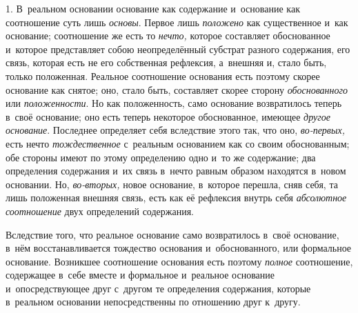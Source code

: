 
1. В~реальном основании основание как содержание
и~основание как соотношение суть лишь {\em основы}.
Первое лишь {\em положено} как существенное и~как
основание; соотношение же есть то {\em нечто,} которое
составляет обоснованное и~которое представляет собою неопределённый
субстрат разного содержания, его связь, которая есть не его собственная
рефлексия, а~внешняя и, стало быть, только положенная. Реальное соотношение
основания есть поэтому скорее основание как снятое; оно, стало быть,
составляет скорее сторону {\em обоснованного} или
{\em положенности}. Но как положенность, само основание
возвратилось теперь в~своё основание; оно есть теперь некоторое
обоснованное, имеющее {\em другое основание}. Последнее
определяет себя вследствие этого так, что оно,
{\em во-первых,} есть нечто
{\em тождественное} с~реальным основанием как со своим
обоснованным; обе стороны имеют по этому определению одно и~то же
содержание; два определения содержания и~их связь в~нечто равным образом
находятся в~новом основании. Но, {\em во-вторых,} новое
основание, в~которое перешла, сняв себя, та лишь положенная внешняя связь,
есть как её рефлексия внутрь себя {\em абсолютное
соотношение} двух определений содержания.

Вследствие того, что реальное основание само возвратилось в~своё основание,
в~нём восстанавливается тождество основания и~обоснованного, или формальное
основание. Возникшее соотношение основания есть поэтому
{\em полное} соотношение, содержащее в~себе вместе и
формальное и~реальное основание и~опосредствующее друг с~другом те
определения содержания, которые в~реальном основании непосредственны по
отношению друг к~другу.

